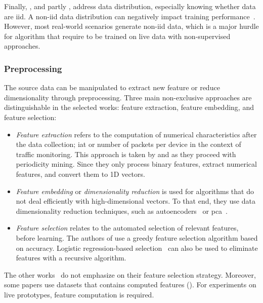 Finally, \cite{chen_Networkanomalydetection_2020b}, and partly  \cite{hei_trustedfeatureaggregator_2020}, address data distribution, especially knowing whether data are \gls{iid}.
A non-\gls{iid} data distribution can negatively impact training performance~\cite{Yang2019}.
However, most real-world scenarios generate non-\gls{iid} data, which is a major hurdle for algorithm that require to be trained on live data with non-supervised approaches.

\subsubsection{Preprocessing}
\label{sec:sota.quali.preprocess}

The source data can be manipulated to extract new feature or reduce dimensionality through preprocessing.
Three main non-exclusive approaches are distinguishable in the selected works: feature extraction, feature embedding, and feature selection:
\begin{itemize}
    \item \emph{Feature extraction} refers to the computation of numerical characteristics after the data collection; \eg \gls{iat} or number of packets per device in the context of traffic monitoring.
This approach is taken by \textcite{pahl_AllEyesYou_2018} and \textcite{nguyen_DIoTFederatedSelflearning_2019} as they proceed with periodicity mining.
Since they only process binary features, \textcite{qin_LineSpeedScalableIntrusion_2020a} extract numerical features, and convert them to 1D vectors.
    \item \emph{Feature embedding} or \emph{dimensionality reduction} is used for algorithms that do not deal efficiently with high-dimensional vectors.
To that end, they use data dimensionality reduction techniques, such as autoencoders~\cite{chen_Networkanomalydetection_2020} or \gls{pca}~\cite{kim_CollaborativeAnomalyDetection_2020}.
    \item \emph{Feature selection} relates to the automated selection of relevant features, before learning.
The authors of \cite{qin_FederatedLearningBasedNetwork_2021} use a greedy feature selection algorithm based on accuracy.
Logistic regression-based selection~\cite{al-athbaal-marri_FederatedMimicLearning_2020} can also be used to eliminate features with a recursive algorithm.
\end{itemize}

The other works~\cite{zhang_BlockchainbasedFederatedLearning_2020,schneble_Attackdetectionusing_2019,li_DeepFedFederatedDeep_2020,rathore_BlockSecIoTNetBlockchainbaseddecentralized_2019} do not emphasize on their feature selection strategy.
Moreover, some papers \cite{li_DeepFedFederatedDeep_2020,schneble_Attackdetectionusing_2019,zhao_MultiTaskNetworkAnomaly_2019} use datasets that contains computed features ().
For experiments on live prototypes, feature computation is required.

